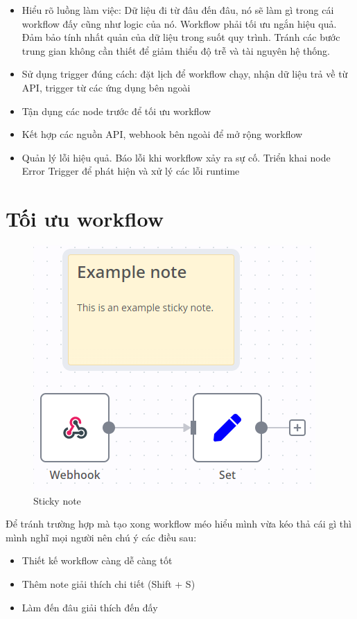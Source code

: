 \begin{itemize}
    \item Hiểu rõ luồng làm việc: Dữ liệu đi từ đâu đến đâu, nó sẽ làm gì trong cái workflow đấy cũng như logic của nó. Workflow phải tối ưu ngắn hiệu quả. Đảm bảo tính nhất quản của dữ liệu trong suốt quy trình. Tránh các bước trung gian không cần thiết để giảm thiểu độ trễ và tài nguyên hệ thống. 
    \item Sử dụng trigger đúng cách: đặt lịch để workflow chạy, nhận dữ liệu trả về từ API, trigger từ các ứng dụng bên ngoài 
    \item Tận dụng các node trước để tối ưu workflow
    \item Kết hợp các nguồn API, webhook bên ngoài để mở rộng workflow 
    \item Quản lý lỗi hiệu quả. Báo lỗi khi workflow xảy ra sự cố. Triển khai node Error Trigger để phát hiện và xử lý các lỗi runtime
\end{itemize}

\newpage
\section{Tối ưu workflow}
\begin{figure}[htbp]
    \centering
    \includegraphics[width=0.8\linewidth]{Chap1-7/sticky-note.png}
    \caption{Sticky note}
\end{figure}

Để tránh trường hợp mà tạo xong workflow méo hiểu mình vừa kéo thả cái gì thì mình nghĩ mọi người nên chú ý các điều sau:
\begin{itemize}
    \item Thiết kế workflow càng dễ càng tốt
    \item Thêm note giải thích chi tiết (Shift + S)
    \item Làm đến đâu giải thích đến đấy
\end{itemize}



